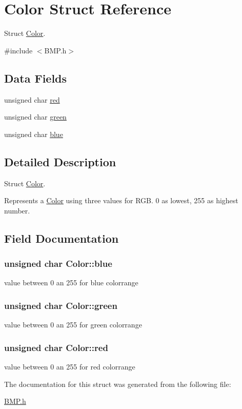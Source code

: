 \hypertarget{structColor}{\section{Color Struct Reference}
\label{structColor}
}


Struct \hyperlink{structColor}{Color}.  




{\ttfamily \#include $<$B\-M\-P.\-h$>$}

\subsection*{Data Fields}
\begin{DoxyCompactItemize}
\item 
unsigned char \hyperlink{structColor_a245f5a423cdaaaeff27047036c24b7ef}{red}
\item 
unsigned char \hyperlink{structColor_a070831365fe6c626bc0020915a917081}{green}
\item 
unsigned char \hyperlink{structColor_a5b425af958edb0e7835eb08daeb90e71}{blue}
\end{DoxyCompactItemize}


\subsection{Detailed Description}
Struct \hyperlink{structColor}{Color}. 

Represents a \hyperlink{structColor}{Color} using three values for R\-G\-B. 0 as lowest, 255 as highest number. 

\subsection{Field Documentation}
\hypertarget{structColor_a5b425af958edb0e7835eb08daeb90e71}{
\subsubsection[{blue}]{\setlength{\rightskip}{0pt plus 5cm}unsigned char Color\-::blue}}\label{structColor_a5b425af958edb0e7835eb08daeb90e71}
value between 0 an 255 for blue colorrange \hypertarget{structColor_a070831365fe6c626bc0020915a917081}{
\subsubsection[{green}]{\setlength{\rightskip}{0pt plus 5cm}unsigned char Color\-::green}}\label{structColor_a070831365fe6c626bc0020915a917081}
value between 0 an 255 for green colorrange \hypertarget{structColor_a245f5a423cdaaaeff27047036c24b7ef}{
\subsubsection[{red}]{\setlength{\rightskip}{0pt plus 5cm}unsigned char Color\-::red}}\label{structColor_a245f5a423cdaaaeff27047036c24b7ef}
value between 0 an 255 for red colorrange 

The documentation for this struct was generated from the following file\-:\begin{DoxyCompactItemize}
\item 
\hyperlink{BMP_8h}{B\-M\-P.\-h}\end{DoxyCompactItemize}
